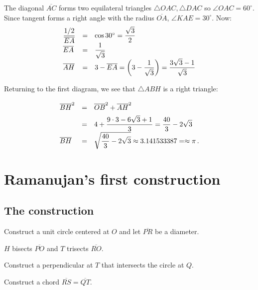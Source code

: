 The diagonal $\overline{AC}$ forms two equilateral triangles $\triangle OAC, \triangle DAC$ so $\angle OAC=60^\circ$. Since tangent forms a right angle with the radius $\overline{OA}$, $\angle KAE=30^\circ$. Now:
\begin{displaymath}
\renewcommand{\arraystretch}{1.5}
\begin{array}{lcl}
\disfrac{1/2}{\overline{EA}}&=&
\cos 30^\circ=\disfrac{\sqrt{3}}{2}\\
\overline{EA}&=&\disfrac{1}{\sqrt{3}}\\
\overline{AH}&=&3-\overline{EA}=\left(3-\disfrac{1}{\sqrt{3}}\right)
=\disfrac{3\sqrt{3}-1}{\sqrt{3}}\\
\end{array}
\end{displaymath}

Returning to the first diagram, we see that $\triangle ABH$ is a right triangle:
\begin{displaymath}
\renewcommand{\arraystretch}{2}
\begin{array}{lcl}
\overline{BH}^2&=&\overline{OB}^2+\overline{AH}^2\\
&=&4+\disfrac{9\cdot 3 -6\sqrt{3}+1}{3}=\disfrac{40}{3}-2\sqrt{3}\\
\overline{BH}&=&\sqrt{\disfrac{40}{3}-2\sqrt{3}}\approx 3.141533387=\approx \pi\,.
\end{array}
\end{displaymath}

\newpage





\section{Ramanujan's first construction}


\subsection{The construction}

Construct a unit circle centered at $O$ and let $\overline{PR}$ be a diameter. 

$H$ bisects $\overline{PO}$ and $T$ trisects $\overline{RO}$. 

Construct a perpendicular at $T$ that intersects the circle at $Q$.

Construct a chord $\overline{RS}=\overline{QT}$.

